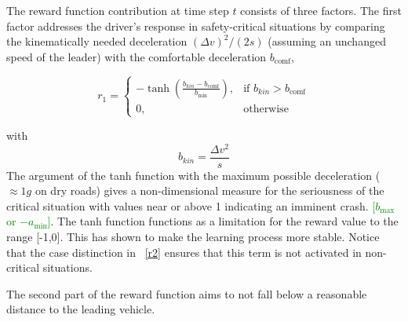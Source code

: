 \documentclass[review]{elsarticle}
\providecommand{\green}[1]{\textcolor{green}{#1}}
\providecommand{\martinc}[1]{\green{[#1]}} %
\providecommand{\sub}[1]{_{\mathrm{#1}}}  %
\providecommand{\3}{{\ss}}
\begin{document}
The reward function contribution at time step $t$ consists of three factors. 
The first factor addresses the driver's
response in safety-critical situations by comparing the
kinematically needed deceleration $(\Delta v)^2/(2s)$ (assuming an
unchanged speed of the leader) with the
comfortable deceleration $b\sub{comf}$,



\begin{equation}
\label{r2}
r_1 = 
\begin{cases}
-\tanh\left(\frac{b_{kin}-b\sub{comf}}{b\sub{min}}\right),& \text{if } b_{kin}>b\sub{comf}\\
0,              & \text{otherwise}
\end{cases}
\end{equation}

with
\begin{equation}
b_{kin} = \frac{\Delta v^2}{s}
\end{equation}
The argument of the tanh function with  the
maximum possible deceleration ($\approx 1 g$ on dry roads) gives a
non-dimensional measure for the seriousness of the critical situation
with values 
near or above 1 indicating an imminent crash. \martinc{$b\sub{max}$
	or $-a\sub{min}$}. The tanh function functions as a limitation for the reward value to the range [-1,0]. This has shown to make the learning process more stable. Notice that the case distinction in ~\eqref{r2}  ensures that
this term is not activated in non-critical situations.

The second part of the reward function aims to not fall below a reasonable
distance to the leading vehicle. 
\end{document}
